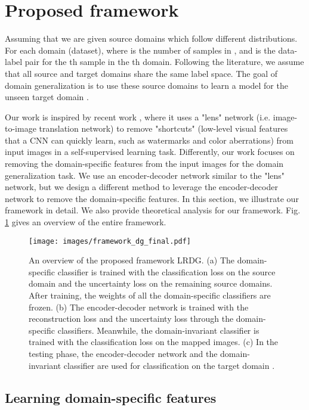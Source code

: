 \documentclass{article}
\begin{document}
\section{Proposed framework}

Assuming that we are given  source domains  which follow different distributions. For each domain (dataset),  where  is the number of samples in , and  is the data-label pair for the th sample in the th domain. Following the literature, we assume that all source and target domains share the same label space. The goal of domain generalization is to use these source domains  to learn a model for the unseen target domain . 

Our work is inspired by recent work \cite{minderer2020automatic}, where it uses a "lens" network (i.e. image-to-image translation network) to remove "shortcuts" (low-level visual features that a CNN can quickly learn, such as watermarks and color aberrations) from input images in a self-supervised learning task. Differently, our work focuses on removing the domain-specific features from the input images for the domain generalization task. We use an encoder-decoder network similar to the "lens" network, but we design a different method to leverage the encoder-decoder network to remove the domain-specific features. In this section, we illustrate our framework in detail. We also provide theoretical analysis for our framework. Fig. \ref{fig:framework} gives an overview of the entire framework.

\begin{figure}[t]
	\begin{center}
	\texttt{[image: images/framework\_dg\_final.pdf]}
	\end{center}
	\caption{An overview of the proposed framework LRDG. (a) The domain-specific classifier  is trained with the classification loss  on the source domain  and the uncertainty loss  on the remaining source domains. After training, the weights of all the domain-specific classifiers are frozen. (b) The encoder-decoder network  is trained with the reconstruction loss  and the uncertainty loss  through the domain-specific classifiers. Meanwhile, the domain-invariant classifier  is trained with the classification loss  on the mapped images. (c) In the testing phase, the encoder-decoder network  and the domain-invariant classifier  are used for classification on the target domain .}
	\label{fig:framework}
\end{figure}

\subsection{Learning domain-specific features}
\end{document}
